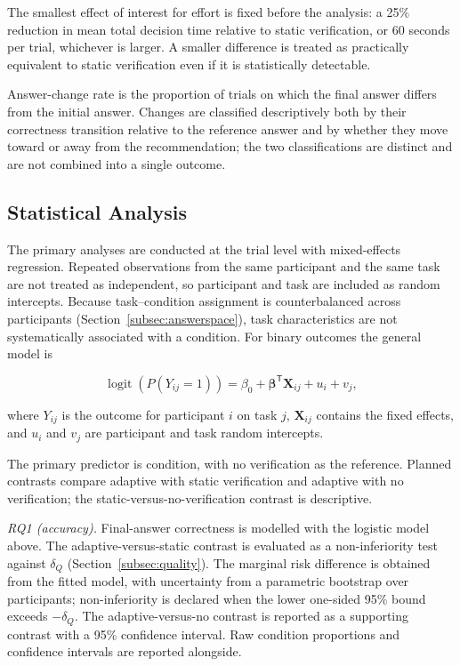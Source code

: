 \documentclass[oneside,final,14pt,a4paper]{extreport}
\begin{document}
The smallest effect of interest for effort is fixed before the analysis: a 25\%
reduction in mean total decision time relative to static verification, or 60
seconds per trial, whichever is larger. A smaller difference is treated as
practically equivalent to static verification even if it is statistically
detectable.

Answer-change rate is the proportion of trials on which the final answer differs
from the initial answer. Changes are classified descriptively both by their
correctness transition relative to the reference answer and by whether they move
toward or away from the recommendation; the two classifications are distinct and
are not combined into a single outcome.

\subsection{Statistical Analysis}
\label{subsec:analysis}

The primary analyses are conducted at the trial level with mixed-effects
regression. Repeated observations from the same participant and the same task
are not treated as independent, so participant and task are included as random
intercepts. Because task--condition assignment is counterbalanced across
participants (Section~\ref{subsec:answerspace}), task characteristics are not
systematically associated with a condition. For binary outcomes the general
model is

$$
\operatorname{logit}\!\left(P(Y_{ij}=1)\right)
=
\beta_0
+
\boldsymbol{\beta}^{\mathsf{T}}\mathbf{X}_{ij}
+
u_i
+
v_j,
$$

where $Y_{ij}$ is the outcome for participant $i$ on task $j$, $\mathbf{X}_{ij}$
contains the fixed effects, and $u_i$ and $v_j$ are participant and task random
intercepts.

The primary predictor is condition, with no verification as the reference.
Planned contrasts compare adaptive with static verification and adaptive with
no verification; the static-versus-no-verification contrast is descriptive.

\emph{RQ1 (accuracy).} Final-answer correctness is modelled with the logistic
model above. The adaptive-versus-static contrast is evaluated as a
non-inferiority test against $\delta_Q$ (Section~\ref{subsec:quality}). The
marginal risk difference is obtained from the fitted model, with uncertainty
from a parametric bootstrap over participants; non-inferiority is declared when
the lower one-sided 95\% bound exceeds $-\delta_Q$. The adaptive-versus-no
contrast is reported as a supporting contrast with a 95\% confidence interval.
Raw condition proportions and confidence intervals are reported alongside.
\end{document}
